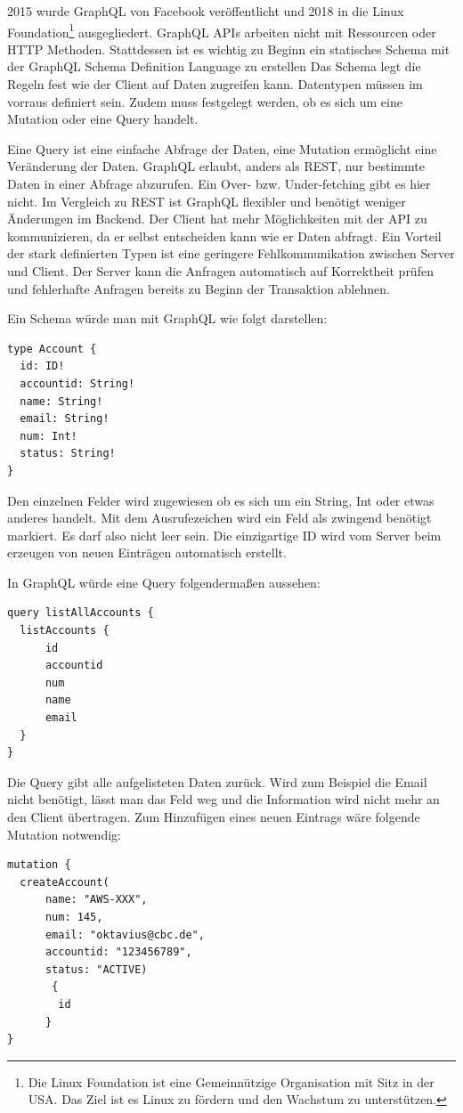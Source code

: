 2015 wurde GraphQL von Facebook veröffentlicht und 2018 in die Linux Foundation\footnote{Die Linux Foundation ist eine Gemeinnützige Organisation mit Sitz in der USA.
Das Ziel ist es Linux zu fördern und den Wachstum zu unterstützen.} ausgegliedert.
GraphQL APIs arbeiten nicht mit Ressourcen oder HTTP Methoden.
Stattdessen ist es wichtig zu Beginn ein statisches Schema mit der GraphQL Schema Definition Language zu erstellen
Das Schema legt die Regeln fest wie der Client auf Daten zugreifen kann.
Datentypen müssen im vorraus definiert sein.
Zudem muss festgelegt werden, ob es sich um eine Mutation oder eine Query handelt.

Eine Query ist eine einfache Abfrage der Daten, eine Mutation ermöglicht eine Veränderung der Daten.
GraphQL erlaubt, anders als REST, nur bestimmte Daten in einer Abfrage abzurufen. Ein Over- bzw. Under-fetching gibt es hier nicht.
Im Vergleich zu REST ist GraphQL flexibler und benötigt weniger Änderungen im Backend. Der Client hat mehr Möglichkeiten
mit der API zu kommunizieren, da er selbst entscheiden kann wie er Daten abfragt. Ein Vorteil der stark definierten Typen ist
eine geringere Fehlkommunikation zwischen Server und Client.
Der Server kann die Anfragen automatisch auf Korrektheit prüfen und fehlerhafte Anfragen bereits zu Beginn der Transaktion ablehnen.

Ein Schema würde man mit GraphQL wie folgt darstellen:
\begin{lstlisting}
type Account {
  id: ID!
  accountid: String!
  name: String!
  email: String!
  num: Int!
  status: String!
}
\end{lstlisting}

Den einzelnen Felder wird zugewiesen ob es sich um ein String, Int oder etwas anderes handelt. Mit dem Ausrufezeichen wird ein Feld als zwingend benötigt markiert.
Es darf also nicht leer sein. Die einzigartige ID wird vom Server beim erzeugen von neuen Einträgen automatisch erstellt.

In GraphQL würde eine Query folgendermaßen aussehen:
\begin{lstlisting}
query listAllAccounts {
  listAccounts {
      id
      accountid
      num
      name
      email
  }
}
\end{lstlisting}

Die Query gibt alle aufgelisteten Daten zurück.
Wird zum Beispiel die Email nicht benötigt, lässt man das Feld weg und die Information wird nicht mehr an den Client übertragen.
Zum Hinzufügen eines neuen Eintrags wäre folgende Mutation notwendig:
\begin{lstlisting}
mutation {
  createAccount(
      name: "AWS-XXX",
      num: 145,
      email: "oktavius@cbc.de",
      accountid: "123456789",
      status: "ACTIVE)
       {
        id
      }
}
\end{lstlisting}

